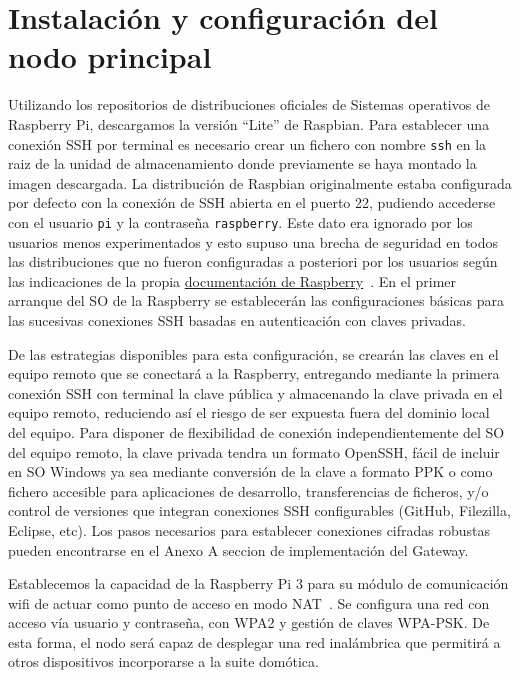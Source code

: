 \section{Instalación y configuración del nodo principal}
\label{makereference4.7}
 Utilizando los repositorios de distribuciones oficiales de Sistemas operativos de Raspberry Pi, descargamos la versión ``Lite'' de Raspbian. Para establecer una conexión SSH por terminal es necesario crear un fichero con nombre \verb|ssh| en la raiz de la unidad de almacenamiento donde previamente se haya montado la imagen descargada. La distribución de Raspbian originalmente estaba configurada por defecto con la conexión de SSH abierta en el puerto 22, pudiendo accederse con el usuario \verb|pi| y la contraseña \verb|raspberry|. Este dato era ignorado por los usuarios menos experimentados y esto supuso una brecha de seguridad en todos las distribuciones que no fueron configuradas a posteriori por los usuarios según las indicaciones de la propia \href{https://www.raspberrypi.org/documentation/configuration/security.md}{documentación de Raspberry}~\cite{securingyourraspberrypi}. En el primer arranque del SO de la Raspberry se establecerán las configuraciones básicas para las sucesivas conexiones SSH basadas en autenticación con claves privadas.

 De las estrategias disponibles para esta configuración, se crearán las claves en el equipo remoto que se conectará a la Raspberry, entregando mediante la primera conexión SSH con terminal la clave pública y almacenando la clave privada en el equipo remoto, reduciendo así el riesgo de ser expuesta fuera del dominio local del equipo. Para disponer de flexibilidad de conexión independientemente del SO del equipo remoto, la clave privada tendra un formato OpenSSH, fácil de incluir en SO Windows ya sea mediante conversión de la clave a formato PPK o como fichero accesible para aplicaciones de desarrollo, transferencias de ficheros, y/o control de versiones que integran conexiones SSH configurables (GitHub, Filezilla, Eclipse, etc). Los pasos necesarios para establecer conexiones cifradas robustas pueden encontrarse en el Anexo A seccion de implementación del Gateway.

Establecemos la capacidad de la Raspberry Pi 3 para su módulo de comunicación wifi de actuar como punto de acceso en modo NAT~\cite{raspberrypiasaccesspoint}. Se configura una red con acceso vía usuario y contraseña, con WPA2 y gestión de claves WPA-PSK. De esta forma, el nodo será capaz de desplegar una red inalámbrica que permitirá a otros dispositivos incorporarse a la suite domótica.

